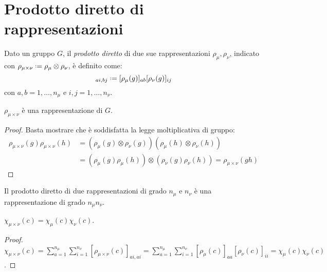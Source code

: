 \section{Prodotto diretto di rappresentazioni}

\begin{definition}
	Dato un gruppo $ G $, il \textit{prodotto diretto} di due sue rappresentazioni $ \rho_{\mu}, \rho_{\nu} $, indicato con $ \rho_{\mu \times \nu} \defeq \rho_{\mu} \otimes \rho_{\nu} $, è definito come:
	\begin{equation}
		[\rho_{\mu \times \nu}(g)]_{ai,bj} \defeq [\rho_{\mu}(g)]_{ab} [\rho_{\nu}(g)]_{ij}
		\label{eq:8.29}
	\end{equation}
	con $ a,b = 1,\dots,n_{\mu} $ e $ i,j = 1,\dots,n_{\nu} $.
\end{definition}

\begin{proposition}
	$ \rho_{\mu \times \nu} $ è una rappresentazione di $ G $.
\end{proposition}
\begin{proof}
	Basta mostrare che è soddisfatta la legge moltiplicativa di gruppo:
	\begin{equation*}
		\begin{split}
			\rho_{\mu \times \nu}(g) \rho_{\mu \times \nu}(h)
			&= (\rho_{\mu}(g) \otimes \rho_{\nu}(g))(\rho_{\mu}(h) \otimes \rho_{\nu}(h)) \\
			&= (\rho_{\mu}(g) \rho_{\mu}(h)) \otimes (\rho_{\nu}(g) \rho_{\nu}(h)) = \rho_{\mu \times \nu}(gh)
		\end{split}
	\end{equation*}
\end{proof}

Il prodotto diretto di due rappresentazioni di grado $ n_{\mu} $ e $ n_{\nu} $ è una rappresentazione di grado $ n_{\mu} n_{\nu} $.

\begin{proposition}
	$ \chi_{\mu \times \nu}(c) = \chi_{\mu}(c) \chi_{\nu}(c) $.
\end{proposition}
\begin{proof}
	$ \chi_{\mu \times \nu}(c) = \sum_{a = 1}^{n_{\mu}} \sum_{i = 1}^{n_{\nu}} [\rho_{\mu \times \nu}(c)]_{ai,ai} = \sum_{a = 1}^{n_{\mu}} \sum_{i = 1}^{n_{\nu}} [\rho_{\mu}(c)]_{aa} [\rho_{\nu}(c)]_{ii} = \chi_{\mu}(c) \chi_{\nu}(c) $.
\end{proof}

